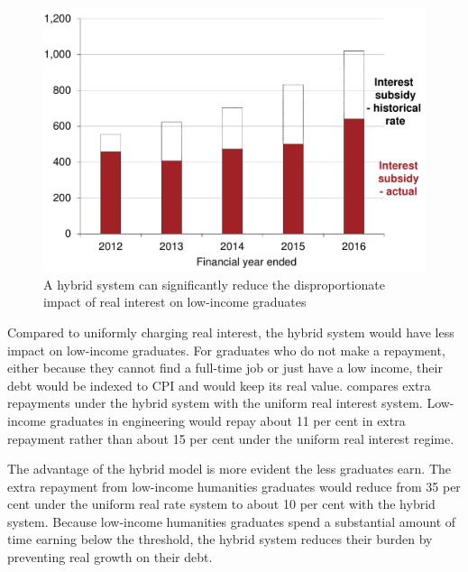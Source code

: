 \documentclass[embargoed]{grattan}
\begin{document}
\begin{figure}
\caption{A hybrid system can significantly reduce the disproportionate impact of real interest on low-income graduates}\label{fig:fig17-a-hybrid-system-can-signif-reduce-disprop-impact-of-real-interest-low-income-grads}


\includegraphics[page=17]{atlas/Chartpack.pdf}
\end{figure}

Compared to uniformly charging real interest, the hybrid system would have less impact on low-income graduates.
For graduates who do not make a repayment, either because they cannot find a full-time job or just have a low income, their debt would be indexed to \gls{CPI} and would keep its real value.
 compares extra repayments under the hybrid system with the uniform real interest system.
Low-income graduates in engineering would repay about 11 per cent in extra repayment rather than about 15 per cent under the uniform real interest regime.

The advantage of the hybrid model is more evident the less graduates earn.
The extra repayment from low-income humanities graduates would reduce from 35 per cent under the uniform real rate system to about 10 per cent with the hybrid system.
Because low-income humanities graduates spend a substantial amount of time earning below the threshold, the hybrid system reduces their burden by preventing real growth on their debt.
\end{document}
